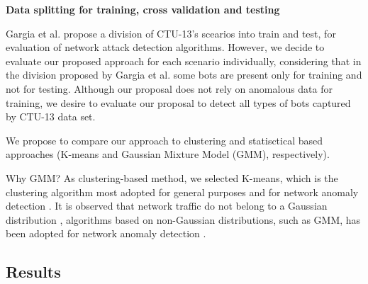 \documentclass[review]{elsarticle}
\begin{document}
\textbf{Data splitting for training, cross validation and testing}

	Gargia et al. \cite{garcia2014empirical} propose a division of CTU-13's scearios into train and test, for evaluation of network attack detection algorithms. 
	However, we decide to evaluate our proposed approach for each scenario individually, considering that in the division proposed by Gargia et al. some bots are present only for training and not for testing. 
	Although our proposal does not rely on anomalous data for training, we desire to evaluate our proposal to detect all types of bots captured by CTU-13 data set.


We propose to compare our approach to clustering and statisctical based approaches (K-means and Gaussian Mixture Model (GMM), respectively).

Why GMM?
As clustering-based method, we selected K-means, which is the clustering algorithm most adopted for general purposes and for network anomaly detection \cite{gaddam2007k,moustafa2019holistic}.
It is observed that network traffic do not belong to a Gaussian distribution \cite{benson2010network,moustafa2019holistic}, algorithms based on non-Gaussian distributions, such as GMM, has been adopted for network anomaly detection \cite{moustafa2019holistic}.


\subsection{Results}
\label{sec:results}
\end{document}
